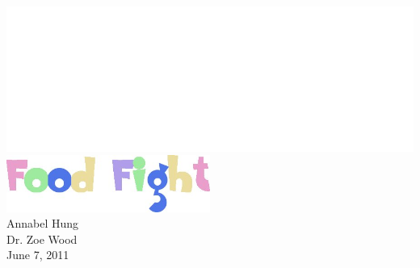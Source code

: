 \begin{titlepage}
\begin{center}
\includegraphics{white}
\includegraphics[width=0.5\textwidth]{logo} \\ [3.5cm]
Annabel Hung \\
Dr. Zoe Wood \\
June 7, 2011
\end{center}
\end{titlepage}